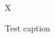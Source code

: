 \documentclass{article}
\begin{document}
\begin{figure}
\mbox{X}\parbox{5cm}{\caption{Test caption}}
\end{figure}
\end{document}
